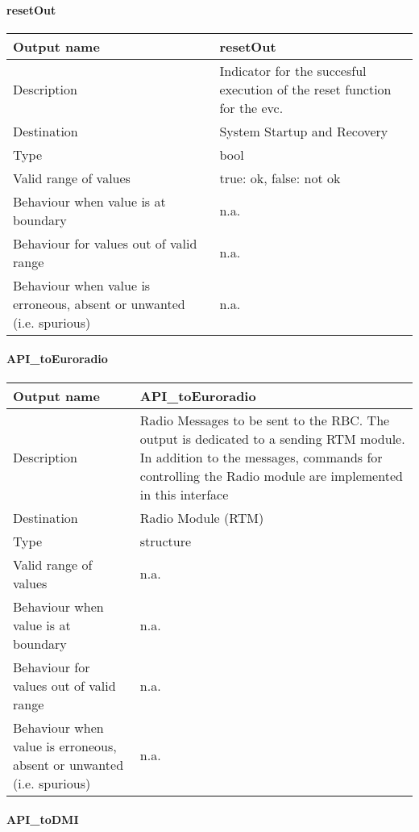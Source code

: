 \paragraph{resetOut}

\begin{longtable}{p{}p{}}
\toprule
Output name				& resetOut \\
\midrule
Description				& Indicator for the succesful execution of the reset function for the evc. \\
\midrule
Destination				& System Startup and Recovery \\ 
\midrule
Type					& bool \\
\midrule
Valid range of values	& true: ok, false: not ok \\
\midrule
Behaviour when value is at boundary	& n.a. \\
\midrule
Behaviour for values out of valid range	& n.a. \\
\midrule
Behaviour when value is erroneous, absent or unwanted (i.e. spurious) & n.a. \\
\bottomrule
\end{longtable}


\paragraph{API\_toEuroradio}

\begin{longtable}{p{}p{}}
\toprule
Output name				& API\_toEuroradio \\
\midrule
Description				& Radio Messages to be sent to the RBC. The output is dedicated to a sending RTM module. In addition to the messages, commands for controlling the Radio module are implemented in this interface  \\
\midrule
Destination				& Radio Module (RTM) \\ 
\midrule
Type					& structure \\
\midrule
Valid range of values	& n.a. \\
\midrule
Behaviour when value is at boundary	& n.a. \\
\midrule
Behaviour for values out of valid range	& n.a. \\
\midrule
Behaviour when value is erroneous, absent or unwanted (i.e. spurious) &n.a. \\
\bottomrule
\end{longtable}


\paragraph{API\_toDMI}


